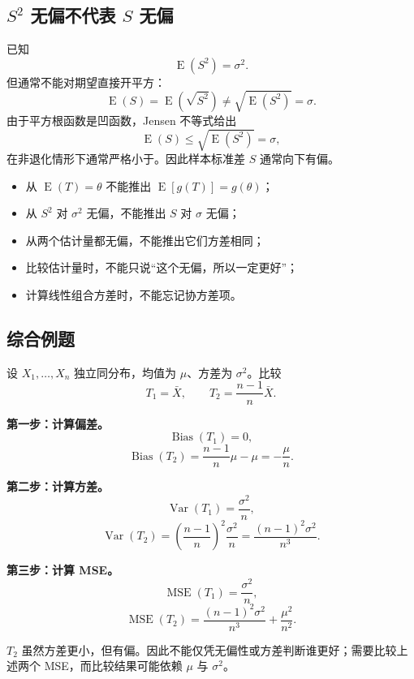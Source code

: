 \documentclass[11pt,a4paper]{article}
\newcommand{\E}{\operatorname{E}}
\newcommand{\Var}{\operatorname{Var}}
\newcommand{\Bias}{\operatorname{Bias}}
\newcommand{\MSE}{\operatorname{MSE}}
\begin{document}
\subsection{\texorpdfstring{$S^2$ 无偏不代表 $S$ 无偏}{S2 无偏不代表 S 无偏}}

已知
\[
  \E(S^2)=\sigma^2.
\]
但通常不能对期望直接开平方：
\[
  \E(S)
  =
  \E(\sqrt{S^2})
  \ne
  \sqrt{\E(S^2)}
  =
  \sigma.
\]
由于平方根函数是凹函数，Jensen 不等式给出
\[
  \E(S)\leq\sqrt{\E(S^2)}=\sigma,
\]
在非退化情形下通常严格小于。因此样本标准差 $S$ 通常向下有偏。

\begin{warnbox}[常见错误]
\begin{itemize}
  \item 从 $\E(T)=\theta$ 不能推出 $\E[g(T)]=g(\theta)$；
  \item 从 $S^2$ 对 $\sigma^2$ 无偏，不能推出 $S$ 对 $\sigma$ 无偏；
  \item 从两个估计量都无偏，不能推出它们方差相同；
  \item 比较估计量时，不能只说“这个无偏，所以一定更好”；
  \item 计算线性组合方差时，不能忘记协方差项。
\end{itemize}
\end{warnbox}

\subsection{综合例题}

\begin{examplebox}[例题：比较两个估计量]
设 $X_1,\ldots,X_n$ 独立同分布，均值为 $\mu$、方差为 $\sigma^2$。比较
\[
  T_1=\bar X,
  \qquad
  T_2=\frac{n-1}{n}\bar X.
\]

\textbf{第一步：计算偏差。}
\[
  \Bias(T_1)=0,
\]
\[
  \Bias(T_2)
  =
  \frac{n-1}{n}\mu-\mu
  =
  -\frac{\mu}{n}.
\]

\textbf{第二步：计算方差。}
\[
  \Var(T_1)=\frac{\sigma^2}{n},
\]
\[
  \Var(T_2)
  =
  \left(\frac{n-1}{n}\right)^2\frac{\sigma^2}{n}
  =
  \frac{(n-1)^2\sigma^2}{n^3}.
\]

\textbf{第三步：计算 MSE。}
\[
  \MSE(T_1)=\frac{\sigma^2}{n},
\]
\[
  \MSE(T_2)
  =
  \frac{(n-1)^2\sigma^2}{n^3}
  +
  \frac{\mu^2}{n^2}.
\]

$T_2$ 虽然方差更小，但有偏。因此不能仅凭无偏性或方差判断谁更好；需要比较上述两个 MSE，而比较结果可能依赖 $\mu$ 与 $\sigma^2$。
\end{examplebox}
\end{document}
